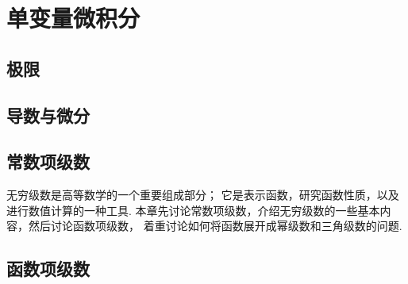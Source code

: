 \part{单变量微积分}
\chapter{极限}
















\chapter{导数与微分}\label{chapter:导数}









\chapter{常数项级数}
无穷级数是高等数学的一个重要组成部分；
它是表示函数，研究函数性质，以及进行数值计算的一种工具.
本章先讨论常数项级数，介绍无穷级数的一些基本内容，然后讨论函数项级数，
着重讨论如何将函数展开成幂级数和三角级数的问题.




\chapter{函数项级数}












